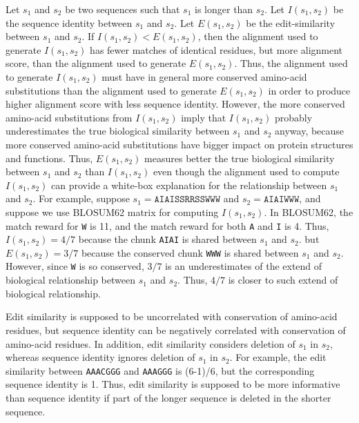 \documentclass[11pt,letterpaper]{article}
\begin{document}
Let \(s_1\) and \(s_2\) be two sequences such that \(s_1\) is longer than \(s_2\).
Let \(I(s_1, s_2)\) be the sequence identity between \(s_1\) and \(s_2\).
Let \(E(s_1, s_2)\) be the edit-similarity between \(s_1\) and \(s_2\).
If \(I(s_1, s_2) < E(s_1, s_2)\), then the alignment used to generate \(I(s_1, s_2)\) has fewer matches of identical residues, but more alignment score, than the alignment used to generate \(E(s_1, s_2)\).
Thus, the alignment used to generate \(I(s_1, s_2)\) must have in general more conserved amino-acid substitutions than the alignment used to generate \(E(s_1, s_2)\) in order to produce higher alignment score with less sequence identity.
However, the more conserved amino-acid substitutions from \(I(s_1, s_2)\) imply that \(I(s_1, s_2)\) probably underestimates the true biological similarity between \(s_1\) and \(s_2\) anyway, because more conserved amino-acid substitutions have bigger impact on protein structures and functions.
Thus, \(E(s_1, s_2)\) measures better the true biological similarity between \(s_1\) and \(s_2\) than \(I(s_1, s_2)\) even though the alignment used to compute \(I(s_1, s_2)\) can provide a white-box explanation for the relationship between \(s_1\) and \(s_2\).
For example, suppose \(s_1 = \texttt{AIAISSRRSSWWW}\) and \(s_2 = \texttt{AIAIWWW}\), 
and suppose we use BLOSUM62 matrix for computing \(I(s_1, s_2)\).
In BLOSUM62, the match reward for \texttt{W} is 11, and the match reward for both \texttt{A} and \texttt{I} is 4.
Thus, \(I(s_1, s_2) = 4/7\) because the           chunk \texttt{AIAI} is shared between \(s_1\) and \(s_2\).
but \(E(s_1, s_2) = 3/7\) because the conserved chunk \texttt{WWW}  is shared between \(s_1\) and \(s_2\).
However, since \texttt{W} is so conserved, \(3/7\) is an underestimates of the extend of biological relationship between \(s_1\) and \(s_2\).
Thus, \(4/7\) is closer to such extend of biological relationship.

Edit similarity is supposed to be uncorrelated with conservation of amino-acid residues, but sequence identity can be negatively correlated with conservation of amino-acid residues.
In addition, edit similarity considers deletion of \(s_1\) in \(s_2\), whereas sequence identity ignores deletion of \(s_1\) in \(s_2\).
For example, the edit similarity between \texttt{AAACGGG} and \texttt{AAAGGG} is (6-1)/6, but the corresponding sequence identity is 1. Thus, edit similarity is supposed to be more informative than sequence identity if part of the longer sequence is deleted in the shorter sequence.

\fi
\end{document}

